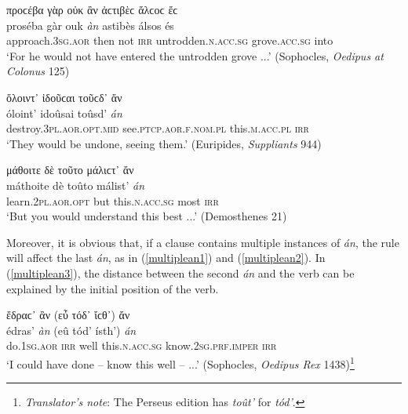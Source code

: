 \begin{exe}
\ex προϲέβα γὰρ οὐκ ἂν ἀϲτιβὲϲ ἄλϲοϲ ἔϲ\\
\gll proséba gàr ouk \emph{àn} astibès álsos és\\
approach.\textsc{3sg.aor} then not \textsc{irr} untrodden.\textsc{n.acc.sg} grove.\textsc{acc.sg} into\\
\trans `For he would not have entered the untrodden grove ...' (Sophocles, \textit{Oedipus at Colonus} 125)
\label{verbfirst1}
\end{exe}

\begin{exe}
\ex ὄλοιντ᾽ ἰδοῦϲαι τοῦϲδ᾽ ἄν\\
\gll óloint' idoûsai toûsd' \emph{án}\\
destroy.\textsc{3pl.aor.opt.mid} see.\textsc{ptcp.aor.f.nom.pl} this.\textsc{m.acc.pl} \textsc{irr}\\
\trans `They would be undone, seeing them.' (Euripides, \textit{Suppliants} 944)
\label{verbfirst2}
\end{exe}

\begin{exe}
\ex μάθοιτε δὲ τοῦτο μάλιϲτ᾽ ἄν\\
\gll máthoite dè toûto málist' \emph{án}\\
learn.\textsc{2pl.aor.opt} but this.\textsc{n.acc.sg} most \textsc{irr}\\
\trans `But you would understand this best ...' (Demosthenes 21)
\label{verbfirst3}
\end{exe}

Moreover, it is obvious that, if a clause contains multiple instances of \emph{án}, the rule will affect the last \emph{án}, as in (\ref{multiplean1}) and (\ref{multiplean2}). In (\ref{multiplean3}), the distance between the second \emph{án} and the verb can be explained by the initial position of the verb.

\begin{exe}
\ex ἔδραϲ᾽ ἂν (εὖ τόδ᾽ ἴϲθ᾽) ἄν\\
\gll édras' \emph{àn} (eû tód' ísth') \emph{án}\\
do.\textsc{1sg.aor} \textsc{irr} well this.\textsc{n.acc.sg} know.\textsc{2sg.prf.imper} \textsc{irr}\\
\trans `I could have done -- know this well -- ...' (Sophocles, \textit{Oedipus Rex} 1438)\footnote{\emph{Translator's note}: The Perseus edition has \textit{toût'} for \textit{tód'}.}
\label{multiplean1}
\end{exe}

